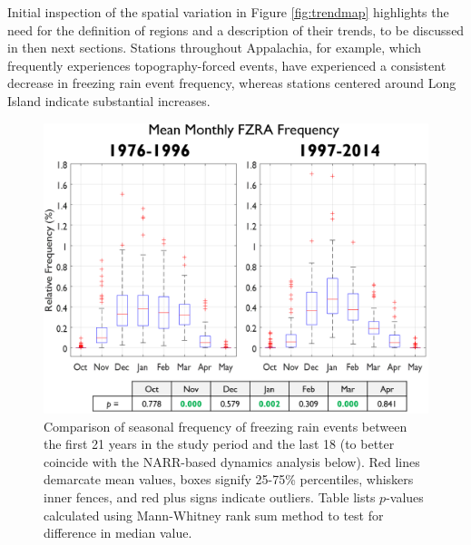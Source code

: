 \documentclass[twocol]{ametsoc}
\begin{document}
Initial inspection of the spatial variation in Figure \ref{fig:trendmap} highlights the need for the definition of regions and a description of their trends, to be discussed in then next sections. Stations throughout Appalachia, for example, which frequently experiences topography-forced events, have experienced a consistent decrease in freezing rain event frequency, whereas stations centered around Long Island indicate substantial increases.  

\begin{figure}
\centering
\includegraphics[width=.9\textwidth]{Seasonal.PNG}
\caption{\label{fig:seasonal} Comparison of seasonal frequency of freezing rain events between the first 21 years in the study period and the last 18 (to better coincide with the NARR-based dynamics analysis below). Red lines demarcate mean values, boxes signify 25-75\% percentiles, whiskers inner fences, and red plus signs indicate outliers. Table lists $p$-values calculated using Mann-Whitney rank sum method to test for difference in median value.}
\end{figure}
\end{document}
